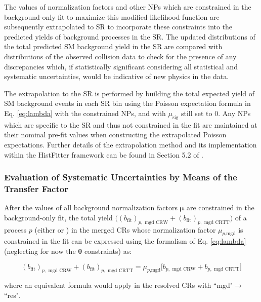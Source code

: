 The values of normalization factors and other NPs which are constrained in the background-only fit to maximize this modified likelihood function are subsequently extrapolated to SR to incorporate these constraints into the predicted yields of background processes in the SR. The updated distributions of the total  predicted SM background yield in the SR are compared with distributions of the observed collision data to check for the presence of any  discrepancies which, if statistically significant considering all statistical and systematic uncertainties, would be indicative of new physics in the data. 

The extrapolation to the SR is performed by building the total expected yield of SM background events in each SR bin using the Poisson expectation formula in Eq. \ref{eq:lambda} with the constrained NPs, and with \(\mu_\text{sig}\) still set to 0. Any NPs which are specific to the SR and thus not constrained in the fit are maintained at their nominal pre-fit values when constructing the extrapolated Poisson expectations. Further details of the extrapolation method and its implementation within the HistFitter framework can be found in Section 5.2 of .

\subsubsection{Evaluation of Systematic Uncertainties by Means of the Transfer Factor}
\label{sec:TF}
After the values of all background normalization factors \(\boldsymbol{\mu}\) are constrained in the background-only fit, the total yield \(\big((b_\text{fit})_{p,\text{ mgd CRW}} + 
(b_\text{fit})_{p,\text{ mgd CRTT}}\big)\) of a process \(p\) (either \wjets or \ttbar) in the merged CRs whose normalization factor \(\mu_{p\text{,mgd}}\) is constrained in the fit can be expressed using the formalism of Eq. \ref{eq:lambda} (neglecting for now the \(\boldsymbol{\theta}\) constraints) as:

\begin{small}
\begin{equation}
\label{eq:normfactor}
(b_\text{fit})_{p,\text{ mgd CRW}} + 
(b_\text{fit})_{p,\text{ mgd CRTT}} = 
\mu_{p\text{,mgd}} \Big[b_{p,\text{ mgd CRW}}  + 
b_{p,\text{ mgd CRTT}}\Big]
\end{equation}
\end{small}

\noindent where an equivalent formula would apply in the resolved CRs with ``mgd"\(\rightarrow\)``res".

